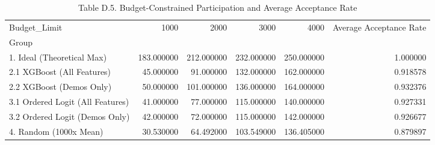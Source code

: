 \begin{table}
\caption{Table D.5. Budget-Constrained Participation and Average Acceptance Rate}
\begin{tabular}{lrrrrr}
\toprule
Budget_Limit & 1000 & 2000 & 3000 & 4000 & Average Acceptance Rate \\
Group &  &  &  &  &  \\
\midrule
1. Ideal (Theoretical Max) & 183.000000 & 212.000000 & 232.000000 & 250.000000 & 1.000000 \\
2.1 XGBoost (All Features) & 45.000000 & 91.000000 & 132.000000 & 162.000000 & 0.918578 \\
2.2 XGBoost (Demos Only) & 50.000000 & 101.000000 & 136.000000 & 164.000000 & 0.932376 \\
3.1 Ordered Logit (All Features) & 41.000000 & 77.000000 & 115.000000 & 140.000000 & 0.927331 \\
3.2 Ordered Logit (Demos Only) & 42.000000 & 72.000000 & 115.000000 & 142.000000 & 0.926677 \\
4. Random (1000x Mean) & 30.530000 & 64.492000 & 103.549000 & 136.405000 & 0.879897 \\
\bottomrule
\end{tabular}
\end{table}
